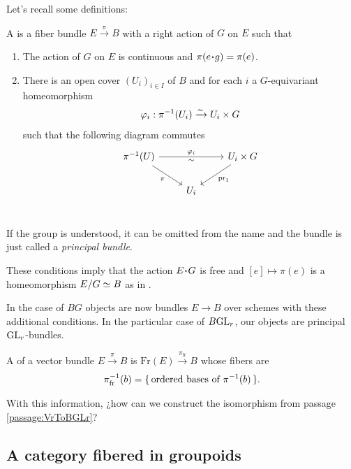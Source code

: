 \documentclass[12pt]{memoir}
\newcounter{passage}
\begin{document}
\begin{ptcb}
    Let's recall some definitions:
    \begin{nonum-Def}
        A  is a fiber bundle \(E\xrightarrow{\pi}B\) with a right action of \(G\) on \(E\) such that
        \begin{enumerate}
            \item The action of \(G\) on \(E\) is continuous and \(\pi(e\.g)=\pi(e)\).
            \item There is an open cover \((U_i)_{i\in I}\) of \(B\) and for each \(i\) a \(G\)-equivariant homeomorphism
            \[
                \varphi_i:\pi^{-1}(U_i)\xrightarrow{\sim} U_i\times G
            \] 
            such that the following diagram commutes
            \[
            \begin{tikzcd}
                \pi^{-1}(U)\arrow[dr,"\pi"'] \arrow[rr,"\vf_i","\sim"'] && U_i\x G\arrow[dl,"\pr_1"] \\
                & U_i  \\
            \end{tikzcd}
            \]
        \end{enumerate}
    \end{nonum-Def}
    If the group is understood, it can be omitted from the name and the bundle is just called a \emph{principal bundle}.\par
    These conditions imply that the action \(E\.G\) is free and \([e]\mapsto \pi(e)\) is a homeomorphism \(E/G\simeq B\) as in \cite{notes:mitchell-principal}.\par
    In the case of \(BG\) objects are now bundles \(E\to B\) over schemes with these additional conditions. In the particular case of \(B\mathrm{GL}_r\), our objects are principal \(\mathrm{GL}_r\)-bundles.
    \begin{nonum-Def}
        A  of a vector bundle \(E\xrightarrow{\pi} B\) is \(\text{Fr}(E)\xrightarrow{\pi_{\text{fr}}} B\) whose fibers are 
        \[
        \pi_{\text{fr}}^{-1}(b)=\{\,\text{ordered bases of }\pi^{-1}(b)\,\}.
        \]
    \end{nonum-Def}

    \begin{Qn}
        With this information, ¿how can we construct the isomorphism from passage \ref{passage:VrToBGLr}?
    \end{Qn}
    \tcbline
\end{ptcb}

\subsection{A category fibered in groupoids}
\end{document}
